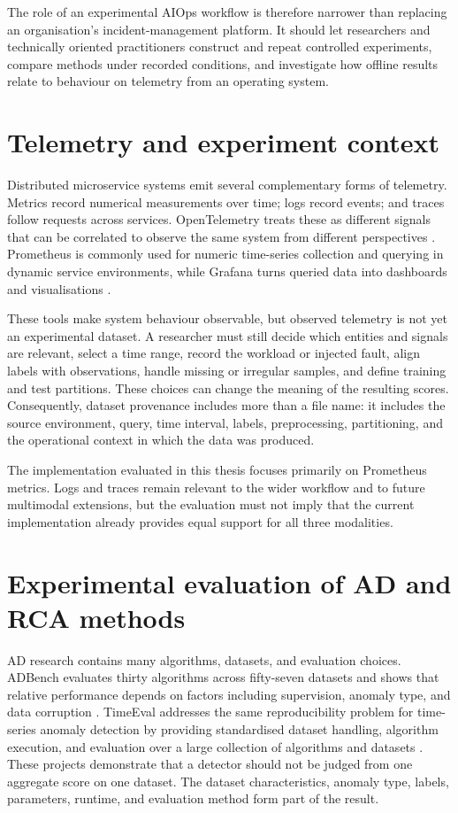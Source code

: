 The role of an experimental AIOps workflow is therefore narrower than replacing an organisation's incident-management platform. It should let researchers and technically oriented practitioners construct and repeat controlled experiments, compare methods under recorded conditions, and investigate how offline results relate to behaviour on telemetry from an operating system.

\section{Telemetry and experiment context}

Distributed microservice systems emit several complementary forms of telemetry. Metrics record numerical measurements over time; logs record events; and traces follow requests across services. OpenTelemetry treats these as different signals that can be correlated to observe the same system from different perspectives \parencite{opentelemetrySignals}. Prometheus is commonly used for numeric time-series collection and querying in dynamic service environments, while Grafana turns queried data into dashboards and visualisations \parencite{prometheusOverview,grafanaDashboards}.

These tools make system behaviour observable, but observed telemetry is not yet an experimental dataset. A researcher must still decide which entities and signals are relevant, select a time range, record the workload or injected fault, align labels with observations, handle missing or irregular samples, and define training and test partitions. These choices can change the meaning of the resulting scores. Consequently, dataset provenance includes more than a file name: it includes the source environment, query, time interval, labels, preprocessing, partitioning, and the operational context in which the data was produced.

The implementation evaluated in this thesis focuses primarily on Prometheus metrics. Logs and traces remain relevant to the wider workflow and to future multimodal extensions, but the evaluation must not imply that the current implementation already provides equal support for all three modalities.

\section{Experimental evaluation of AD and RCA methods}

AD research contains many algorithms, datasets, and evaluation choices. ADBench evaluates thirty algorithms across fifty-seven datasets and shows that relative performance depends on factors including supervision, anomaly type, and data corruption \parencite{han2022adbench}. TimeEval addresses the same reproducibility problem for time-series anomaly detection by providing standardised dataset handling, algorithm execution, and evaluation over a large collection of algorithms and datasets \parencite{wenig2022timeeval}. These projects demonstrate that a detector should not be judged from one aggregate score on one dataset. The dataset characteristics, anomaly type, labels, parameters, runtime, and evaluation method form part of the result.

